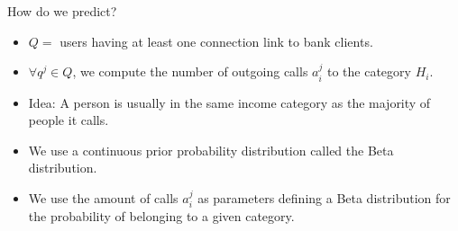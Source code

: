 \documentclass{beamer}
\begin{document}
\begin{frame}{How do we predict?}
\begin{block}

\begin{itemize}

\item $Q = $ users having at least one connection link to bank clients.

\item $\forall q^j \in Q$, we compute the number of outgoing calls $a^j_i$ to the category $H_i$.

\item Idea: A person is usually in the same income category as the majority of people it calls.
\end{itemize}
\end{block}
\pause

\begin{block}

\begin{itemize}
\item We use a continuous prior probability distribution called
the Beta distribution.

\item We use the amount of calls $a^j_i$  as parameters defining a Beta distribution for the probability of belonging to a given category.
\end{itemize}
\end{block}

\end{frame}
\end{document}
